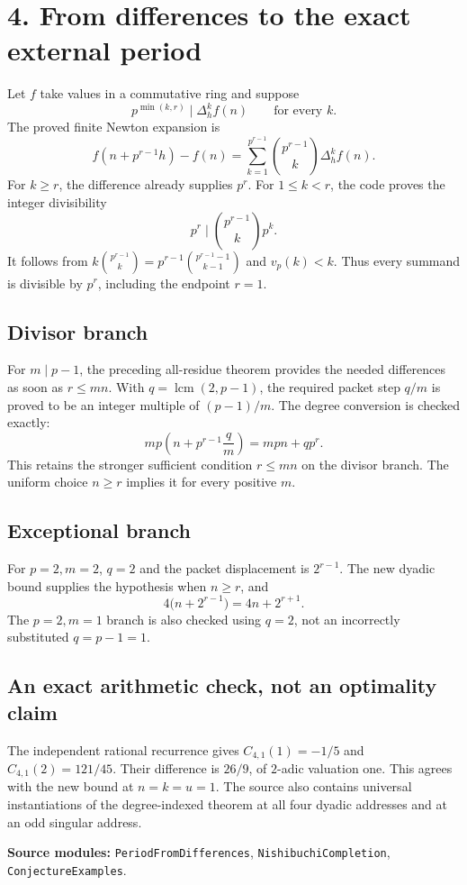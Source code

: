 \documentclass[11pt]{article}
\newcommand{\code}[1]{\texttt{\small #1}}
\begin{document}
\newpage
\section*{4. From differences to the exact external period}
Let $f$ take values in a commutative ring and suppose
\[
 p^{\min(k,r)}\mid\Delta_h^k f(n)\qquad\text{for every }k.
\]
The proved finite Newton expansion is
\[
 f(n+p^{r-1}h)-f(n)=
 \sum_{k=1}^{p^{r-1}}\binom{p^{r-1}}k\Delta_h^k f(n).
\]
For $k\ge r$, the difference already supplies $p^r$. For $1\le k<r$, the code proves the integer divisibility
\[
 p^r\mid\binom{p^{r-1}}k p^k.
\]
It follows from $k\binom{p^{r-1}}k=p^{r-1}\binom{p^{r-1}-1}{k-1}$ and $v_p(k)<k$. Thus every summand is divisible by $p^r$, including the endpoint $r=1$.

\subsection*{Divisor branch}
For $m\mid p-1$, the preceding all-residue theorem provides the needed differences as soon as $r\le mn$. With $q=\operatorname{lcm}(2,p-1)$, the required packet step $q/m$ is proved to be an integer multiple of $(p-1)/m$. The degree conversion is checked exactly:
\[
 mp\left(n+p^{r-1}\frac qm\right)=mpn+qp^r.
\]
This retains the stronger sufficient condition $r\le mn$ on the divisor branch. The uniform choice $n\ge r$ implies it for every positive $m$.

\subsection*{Exceptional branch}
For $p=2,m=2$, $q=2$ and the packet displacement is $2^{r-1}$. The new dyadic bound supplies the hypothesis when $n\ge r$, and
\[
 4\bigl(n+2^{r-1}\bigr)=4n+2^{r+1}.
\]
The $p=2,m=1$ branch is also checked using $q=2$, not an incorrectly substituted $q=p-1=1$.

\subsection*{An exact arithmetic check, not an optimality claim}
The independent rational recurrence gives
$C_{4,1}(1)=-1/5$ and $C_{4,1}(2)=121/45$. Their difference is $26/9$, of $2$-adic valuation one. This agrees with the new bound at $n=k=u=1$. The source also contains universal instantiations of the degree-indexed theorem at all four dyadic addresses and at an odd singular address.

\textbf{Source modules:} \code{PeriodFromDifferences}, \code{NishibuchiCompletion}, \code{ConjectureExamples}.
\end{document}
